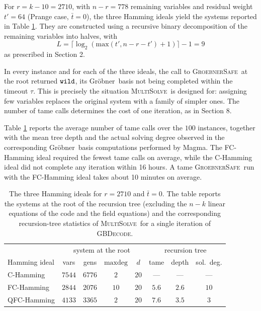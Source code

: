 \documentclass{amsart}
\def\Gr{Gr\"obner}
\def\GBSafe{{\textsc{GroebnerSafe}}}
\def\MultiSolve{{\textsc{MultiSolve}}}
\def\GBDecode{{\textsc{GBDecode}}}
\def\maxdeg{{\mathrm{maxdeg}}}
\def\wild{{\tt wild}}
\def\bt{{\bar{t}}}
\def\max{{\mathrm{max}}}
\def\Magma{{\sc Magma}}
\begin{document}
For $r = k - 10 = 2710$, with $n - r = 778$ remaining variables and residual weight
$t' = 64$ (Prange case, $\bt = 0$), the three Hamming ideals yield the systems
reported in Table \ref{tab:main}. They are constructed using a recursive binary decomposition
of the remaining variables into halves, with
\[
L = \lceil \log_2(\max(t', n-r-t') + 1) \rceil - 1 = 9
\]
as prescribed in Section 2.

In every instance and for each of the three ideals, the call to \GBSafe\ at the root
returned $\wild$, its \Gr\ basis not being completed within the timeout $\tau$. This is
precisely the situation \MultiSolve\ is designed for: assigning few variables replaces
the original system with a family of simpler ones. The number of tame calls determines
the cost of one iteration, as in Section 8.

Table \ref{tab:main} reports the average number of tame calls over the $100$ instances,
together with the mean tree depth and the actual solving degree observed in the corresponding
\Gr\ basis computations performed by \Magma. The FC-Hamming ideal required the fewest
tame calls on average, while the C-Hamming ideal did not complete any iteration
within 16 hours. A tame \GBSafe\ run with the FC-Hamming ideal takes about 10 minutes
on average.

\begin{table}[H]
\begin{center}
\small
\begin{tabular}{lccccccc}
\hline
& \multicolumn{4}{c}{system at the root} & \multicolumn{3}{c}{recursion tree} \\
Hamming ideal & vars & gens & $\maxdeg$ & $d$
              & tame & depth & sol.\ deg. \\
\hline
C-Hamming    & $7544$ & $6776$ & $2$  & $20$ & --- & --- & --- \\
FC-Hamming   & $2844$ & $2076$ & $10$ & $20$ & $5.6$ & $2.6$ & $10$ \\
QFC-Hamming  & $4133$ & $3365$ & $2$  & $20$ & $7.6$ & $3.5$ & $3$ \\
\hline
\end{tabular}
\end{center}
\caption{The three Hamming ideals for $r = 2710$ and $\bt = 0$. The table reports the systems at the
root of the recursion tree (excluding the $n-k$ linear equations of the code and the field
equations) and the corresponding recursion-tree statistics of \MultiSolve\ for a single iteration
of \GBDecode.}
\label{tab:main}
\end{table}
\end{document}
